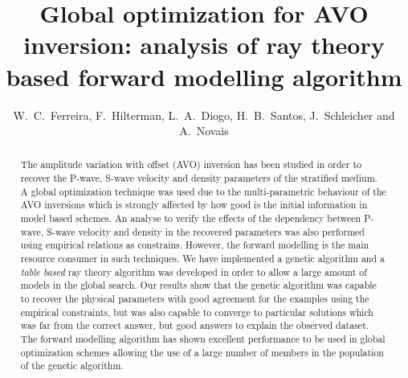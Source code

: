 \documentclass{vie16}
\begin{document}
\title{Global optimization for AVO inversion: analysis of ray theory based 
forward modelling algorithm}
\author{W.~C.~Ferreira, F.~Hilterman, L.~A.~Diogo, H.~B.~Santos, 
J.~Schleicher and A.~Novais}
\maketitle

\begin{abstract}
The amplitude variation with offset (AVO) inversion has been studied in 
order to recover the P-wave, S-wave velocity and density parameters of the 
stratified medium. A global optimization technique was used due to the 
multi-parametric behaviour of the AVO inversions which is strongly affected 
by how good is the initial information in model based schemes. An analyse 
to verify the effects of the dependency between P-wave, S-wave velocity 
and density in the recovered parameters was also performed using empirical 
relations as constrains. However, the forward modelling is the main resource 
consumer in such techniques. We have implemented a genetic algorithm 
and a \textit{table based} ray theory algorithm was developed in order to 
allow a large amount of models in the global search. Our results show that 
the genetic algorithm was capable to recover the physical parameters with 
good agreement for the examples using the empirical constraints, but was 
also capable to converge to particular solutions which was far from the 
correct answer, but good answers to explain the observed dataset. The 
forward modelling algorithm has shown excellent performance to be used in 
global optimization schemes allowing the use of a large number of members 
in the population of the genetic algorithm.
\end{abstract}

\newpage
\end{document}
